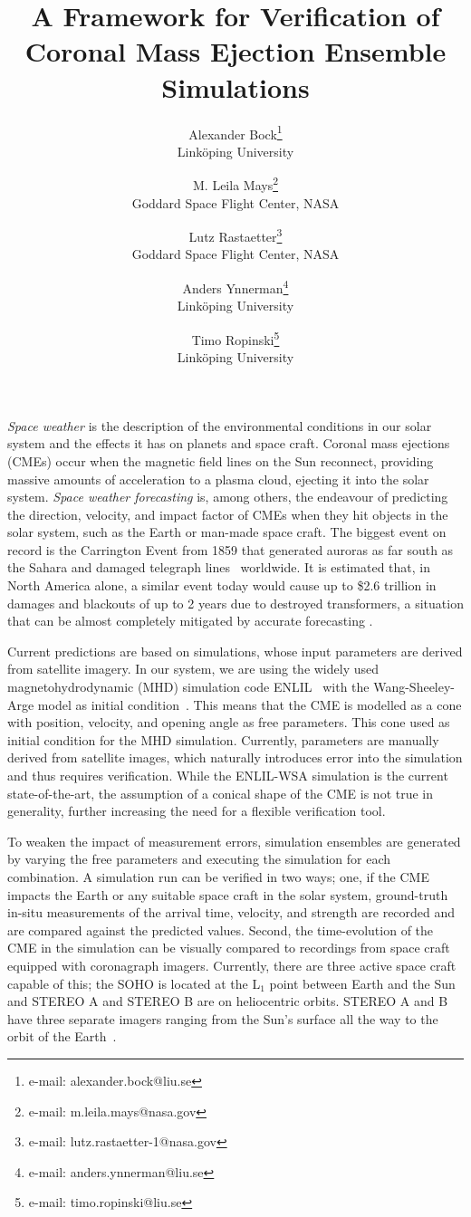 \documentclass{vgtc}                          %
\title{A Framework for Verification of Coronal Mass Ejection Ensemble Simulations}
\author{%
    Alexander Bock\thanks{e-mail: alexander.bock@liu.se}\\%
    \scriptsize Link\"oping University%
\and
    M. Leila Mays\thanks{e-mail: m.leila.mays@nasa.gov}\\%
    \scriptsize Goddard Space Flight Center, NASA\\
\and
    Lutz Rastaetter\thanks{e-mail: lutz.rastaetter-1@nasa.gov}\\%
    \scriptsize Goddard Space Flight Center, NASA
\and
    Anders Ynnerman\thanks{e-mail: anders.ynnerman@liu.se}\\%
    \scriptsize Link\"oping University%
\and
    Timo Ropinski\thanks{e-mail: timo.ropinski@liu.se}\\%
    \scriptsize Link\"oping University%
}
\begin{document}
\maketitle

\emph{Space weather} is the description of the environmental conditions in our solar system and the effects it has on planets and space craft. Coronal mass ejections (CMEs) occur when the magnetic field lines on the Sun reconnect, providing massive amounts of acceleration to a plasma cloud, ejecting it into the solar system. \emph{Space weather forecasting} is, among others, the endeavour of predicting the direction, velocity, and impact factor of CMEs when they hit objects in the solar system, such as the Earth or man-made space craft. The biggest event on record is the Carrington Event from 1859 that generated auroras as far south as the Sahara and damaged telegraph lines~\cite{board2008severe} worldwide. It is estimated that, in North America alone, a similar event today would cause up to \$2.6 trillion in damages and blackouts of up to 2 years due to destroyed transformers, a situation that can be almost completely mitigated by accurate forecasting \cite{lloyds2013impact}.

Current predictions are based on simulations, whose input parameters are derived from satellite imagery. In our system, we are using the widely used magnetohydrodynamic (MHD) simulation code ENLIL~\cite{odstrcil2003modeling} with the Wang-Sheeley-Arge model as initial condition~\cite{parsons2011wang}. This means that the CME is modelled as a cone with position, velocity, and opening angle as free parameters. This cone used as initial condition for the MHD simulation. Currently, parameters are manually derived from satellite images, which naturally introduces error into the simulation and thus requires verification. While the ENLIL-WSA simulation is the current state-of-the-art, the assumption of a conical shape of the CME is not true in generality, further increasing the need for a flexible verification tool.

To weaken the impact of measurement errors, simulation ensembles are generated by varying the free parameters and executing the simulation for each combination. A simulation run can be verified in two ways; one, if the CME impacts the Earth or any suitable space craft in the solar system, ground-truth in-situ measurements of the arrival time, velocity, and strength are recorded and are compared against the predicted values. Second, the time-evolution of the CME in the simulation can be visually compared to recordings from space craft equipped with coronagraph imagers. Currently, there are three active space craft capable of this; the SOHO is located at the L$_1$ point between Earth and the Sun and STEREO A and STEREO B are on heliocentric orbits. STEREO A and B have three separate imagers ranging from the Sun's surface all the way to the orbit of the Earth~\cite{eyles2009heliospheric}.
\end{document}
